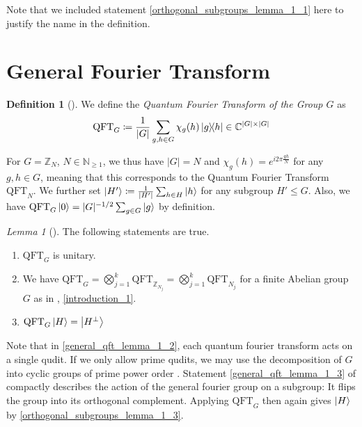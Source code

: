 \documentclass[10pt]{amsart}
\numberwithin{equation}{section}
\theoremstyle{definition}
\newtheorem{definition}{Definition}
\theoremstyle{remark}
\newtheorem{lemma}[theorem]{Lemma}
\begin{document}
    Note that we included statement \ref{orthogonal_subgroups_lemma_1_1} here to justify the name in the definition.

    \section{General Fourier Transform}

    \begin{definition}[{\cite[p. 20]{Lomont}}]
        We define the \emph{Quantum Fourier Transform of the Group \(G\)} as
        \begin{align}
            \text{QFT}_G \coloneqq \frac{1}{|G|} \sum_{g, h \in G} \chi_g(h) \ketbra{g}{h} \in \mathbb{C}^{|G| \times |G|}
        \end{align}
    \end{definition}

    For \(G = \mathbb{Z}_N\), \(N \in \mathbb{N}_{\geq 1}\), we thus have \(|G| = N\) and \(\chi_g(h) = e^{i2\pi\frac{g h}{N}}\) for any \(g, h \in G\), meaning that this corresponds to the Quantum Fourier Transform \(\text{QFT}_N\). We further set \(\ket{H'} \coloneqq \frac{1}{|H'|} \sum_{h \in H} \ket{h}\) for any subgroup \(H' \leq G\). Also, we have \(\text{QFT}_G\ket{0} = |G|^{-1/2}\sum_{g \in G} \ket{g}\) by definition.

    \begin{lemma}[{\cite[pp. 19-21, p. 23]{Lomont}}] \label{general_qft_lemma_1}
        The following statements are true.
        \begin{enumerate}[label=(\roman*)]
            \item \(\text{QFT}_G\) is unitary.
            \item \label{general_qft_lemma_1_2} We have \(\text{QFT}_G = \bigotimes_{j=1}^k \text{QFT}_{\mathbb{Z}_{N_j}} = \bigotimes_{j=1}^k \text{QFT}_{N_j}\) for a finite Abelian group \(G\) as in , \ref{introduction_1}.
            \item \label{general_qft_lemma_1_3} \(\text{QFT}_G \ket{H} = \ket{H^\perp}\)
        \end{enumerate}
    \end{lemma}

    Note that in  \ref{general_qft_lemma_1_2}, each quantum fourier transform acts on a single qudit. If we only allow prime qudits, we may use the decomposition of \(G\) into cyclic groups of prime power order \cite[p. 136]{Fischer}. Statement \ref{general_qft_lemma_1_3} of  compactly describes the action of the general fourier group on a subgroup: It flips the group into its orthogonal complement. Applying \(\text{QFT}_G\) then again gives \(\ket{H}\) by  \ref{orthogonal_subgroups_lemma_1_3}.
\end{document}
